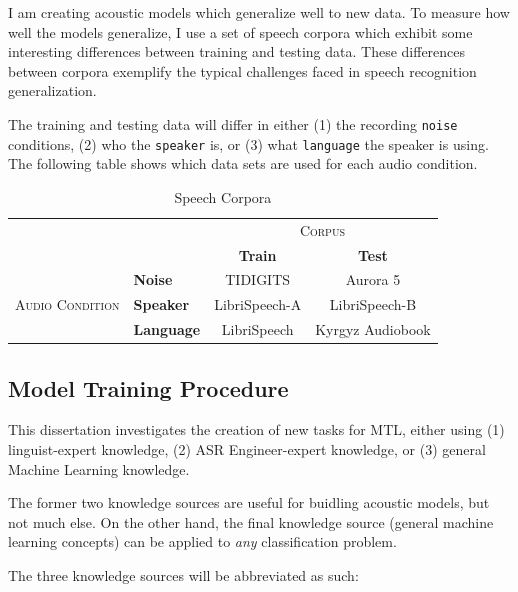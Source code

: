 \documentclass[10pt,a4paper]{article}
\begin{document}
I am creating acoustic models which generalize well to new data. To measure how well the models generalize, I use a set of speech corpora which exhibit some interesting differences between training and testing data. These differences between corpora exemplify the typical challenges faced in speech recognition generalization.

The training and testing data will differ in either (1) the recording \texttt{noise} conditions, (2) who the \texttt{speaker} is, or (3) what \texttt{language} the speaker is using. The following table shows which data sets are used for each audio condition.


\begin{table}[!htbp]
  \centering
  \begin{adjustbox}{width=.75\textwidth}
    \begin{tabular}{clcc}
      \toprule
      && \multicolumn{2}{c}{\textsc{Corpus}}\\
      && \textbf{Train} & \textbf{Test}\\
      \midrule
      \multirow{3}{*}{\textsc{Audio Condition}} &\textbf{Noise} & TIDIGITS & Aurora 5 \\
      &\textbf{Speaker} & LibriSpeech-A & LibriSpeech-B \\
      &\textbf{Language} & LibriSpeech & Kyrgyz Audiobook \\
      \bottomrule
    \end{tabular}
    \label{table:data}
  \end{adjustbox}
  
  \caption{Speech Corpora}
  
\end{table}


\subsection{Model Training Procedure}

This dissertation investigates the creation of new tasks for MTL, either using (1) linguist-expert knowledge, (2) ASR Engineer-expert knowledge, or (3) general Machine Learning knowledge.

The former two knowledge sources are useful for buidling acoustic models, but not much else. On the other hand, the final knowledge source (general machine learning concepts) can be applied to \textit{any} classification problem.

The three knowledge sources will be abbreviated as such:
  
\end{document}
